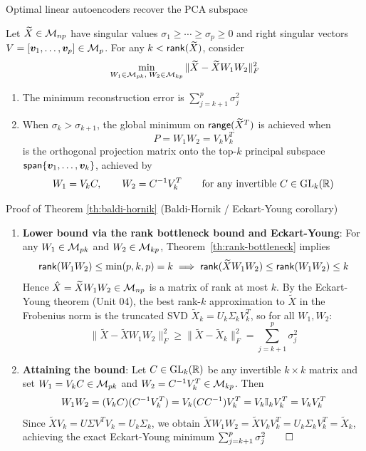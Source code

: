 \documentclass[aspectratio=169]{beamer}\usepackage[]{graphicx}\usepackage[]{xcolor}
\begin{document}
\begin{frame}{Optimal linear autoencoders recover the PCA subspace}
\begin{importanttheorem}
\label{th:baldi-hornik}
Let $\widetilde{X} \in \mathcal{M}_{np}$ have singular values $\sigma_1 \ge \cdots \ge \sigma_p \ge 0$ and right singular vectors $V = [\bm{v}_1, \ldots, \bm{v}_p] \in \mathcal{M}_p$. For any $k < \mathsf{rank}(\widetilde{X})$, consider
\[
\min_{W_1 \in \mathcal{M}_{pk},\; W_2 \in \mathcal{M}_{kp}} \|\widetilde{X} - \widetilde{X} W_1 W_2\|_F^2
\]
\begin{enumerate}
\item The minimum reconstruction error is $\displaystyle \sum_{j=k+1}^p \sigma_j^2$
\item When $\sigma_k > \sigma_{k+1}$, the global minimum on $\mathsf{range}(\widetilde{X}^T)$ is achieved when
\[
P = W_1 W_2 = V_k V_k^T
\]
is the orthogonal projection matrix onto the top-$k$ principal subspace $\mathsf{span}\{\bm{v}_1, \ldots, \bm{v}_k\}$, achieved by
\[
W_1 = V_k C, \qquad W_2 = C^{-1} V_k^T \qquad \text{for any invertible } C \in \operatorname{GL}_k(\mathbb{R})
\]
\end{enumerate}
\end{importanttheorem}
\end{frame}


\begin{frame}[red]{Proof of Theorem \ref{th:baldi-hornik} (Baldi-Hornik / Eckart-Young corollary)}
\begin{enumerate}
\item \textbf{Lower bound via the rank bottleneck bound and Eckart-Young}:
For any $W_1 \in \mathcal{M}_{pk}$ and $W_2 \in \mathcal{M}_{kp}$, Theorem~\ref{th:rank-bottleneck} implies
\[
\mathsf{rank}(W_1 W_2) \le \min(p, k, p) = k \implies \mathsf{rank}(\widetilde{X} W_1 W_2) \le \mathsf{rank}(W_1 W_2) \le k
\]
Hence $\hat{X} = \widetilde{X} W_1 W_2 \in \mathcal{M}_{np}$ is a matrix of rank at most $k$. By the Eckart-Young theorem (Unit 04), the best rank-$k$ approximation to $\widetilde{X}$ in the Frobenius norm is the truncated SVD $\widetilde{X}_k = U_k \Sigma_k V_k^T$, so for all $W_1, W_2$:
\[
\|\widetilde{X} - \widetilde{X} W_1 W_2\|_F^2 \ge \|\widetilde{X} - \widetilde{X}_k\|_F^2 = \sum_{j=k+1}^p \sigma_j^2
\]
\vfill
\item \textbf{Attaining the bound}:
Let $C \in \operatorname{GL}_k(\mathbb{R})$ be any invertible $k \times k$ matrix and set $W_1 = V_k C \in \mathcal{M}_{pk}$ and $W_2 = C^{-1} V_k^T \in \mathcal{M}_{kp}$. Then
\[
W_1 W_2 = (V_k C)(C^{-1} V_k^T) = V_k (C C^{-1}) V_k^T = V_k \mathbb{I}_k V_k^T = V_k V_k^T
\]
Since $\widetilde{X} V_k = U \Sigma V^T V_k = U_k \Sigma_k$, we obtain $\widetilde{X} W_1 W_2 = \widetilde{X} V_k V_k^T = U_k \Sigma_k V_k^T = \widetilde{X}_k$, achieving the exact Eckart-Young minimum $\sum_{j=k+1}^p \sigma_j^2 \qed$
\end{enumerate}
\end{frame}
\end{document}
